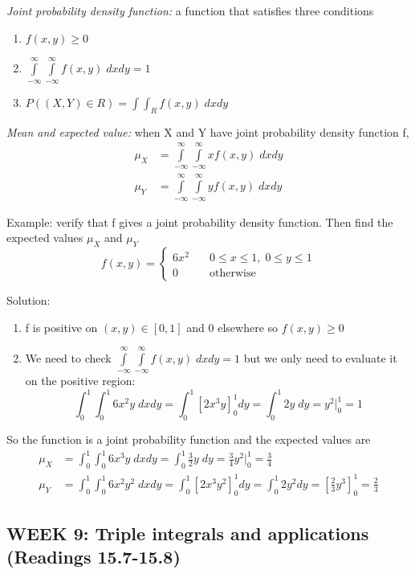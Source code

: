 \documentclass[12pt]{article}
\begin{document}
\emph{Joint probability density function:} a function that satisfies three conditions
\begin{enumerate}
    \item $f(x,y) \geq 0$
    \item $\int\limits_{-\infty}^\infty \int\limits_{-\infty}^\infty f(x,y) \; dx dy = 1$
    \item $P((X, Y) \in R) = \int \int_R f(x,y) \; dx dy$
\end{enumerate}

\emph{Mean and expected value:} when X and Y have joint probability density function f,
\begin{align*}
    \mu_X &= \int\limits_{-\infty}^\infty \int\limits_{-\infty}^\infty x f(x,y) \; dx dy\\
    \mu_Y &= \int\limits_{-\infty}^\infty \int\limits_{-\infty}^\infty y f(x,y) \; dx dy
\end{align*}

Example: verify that f gives a joint probability density function. Then find the expected values $\mu_X$ and $\mu_Y$
\[f(x,y) = \begin{cases}
    6x^2 \quad &0 \leq x \leq 1,\; 0\leq y \leq 1\\
    0 \quad &\text{otherwise}
\end{cases}
\]

Solution:
\begin{enumerate}
    \item f is positive on $(x,y) \in [0, 1]$ and 0 elsewhere so $f(x,y) \geq 0$
    \item We need to check $\int\limits_{-\infty}^\infty \int\limits_{-\infty}^\infty f(x,y) \; dx dy = 1$ but we only need to evaluate it on the positive region:
    \[\int_0^1 \int_0^1 6x^2 y \; dx dy= \int_0^1 \left[2x^3 y\right]_0^1 dy = \int_0^1 2y \; dy=y^2 \big|_0^1 = 1\]
\end{enumerate}
So the function is a joint probability function and the expected values are
\begin{align*}
    \mu_X &= \int_0^1 \int_0^1 6x^3 y \; dx dy = \int_0^1 \frac{3}{2} y \; dy = \frac{3}{4} y^2 \big|_0^1 = \frac{3}{4}\\
    \mu_Y &= \int_0^1 \int_0^1 6x^2 y^2 \; dx dy = \int_0^1 \left[2x^3 y^2\right]_0^1 dy = \int_0^1 2y^2 dy = \left[\frac{2}{3} y^3\right]_0 ^1 = \frac{2}{3}
\end{align*}
\subsection{WEEK 9: Triple integrals and applications (Readings 15.7-15.8)}
\end{document}
